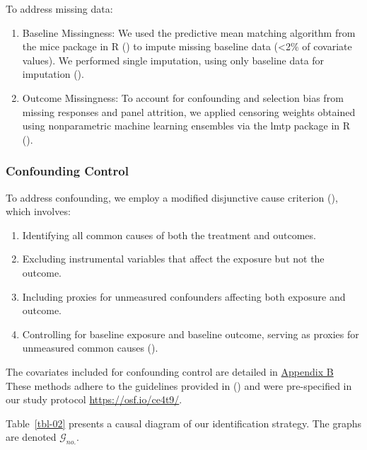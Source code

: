\documentclass[
  single column]{article}
\providecommand{\tightlist}{%
  \setlength{\itemsep}{0pt}\setlength{\parskip}{0pt}}\usepackage{longtable,booktabs,array}
\begin{document}
To address missing data:

\begin{enumerate}
\def\labelenumi{\arabic{enumi}.}
\tightlist
\item
  Baseline Missingness: We used the predictive mean matching algorithm
  from the mice package in R () to impute missing baseline data (\textless2\% of covariate
  values). We performed single imputation, using only baseline data for
  imputation ().
\item
  Outcome Missingness: To account for confounding and selection bias
  from missing responses and panel attrition, we applied censoring
  weights obtained using nonparametric machine learning ensembles via
  the lmtp package in R ().
\end{enumerate}

\subsubsection{Confounding Control}\label{confounding-control}

To address confounding, we employ a modified disjunctive cause criterion
(), which involves:

\begin{enumerate}
\def\labelenumi{\arabic{enumi}.}
\tightlist
\item
  Identifying all common causes of both the treatment and outcomes.
\item
  Excluding instrumental variables that affect the exposure but not the
  outcome.
\item
  Including proxies for unmeasured confounders affecting both exposure
  and outcome.
\item
  Controlling for baseline exposure and baseline outcome, serving as
  proxies for unmeasured common causes
  ().
\end{enumerate}

The covariates included for confounding control are detailed in
\hyperref[appendix-demographics]{Appendix B} These methods adhere to the
guidelines provided in () and were pre-specified in our study protocol
\url{https://osf.io/ce4t9/}.

Table~\ref{tbl-02} presents a causal diagram of our identification
strategy. The graphs are denoted \(\mathcal{G}_{no.}\).
\end{document}
